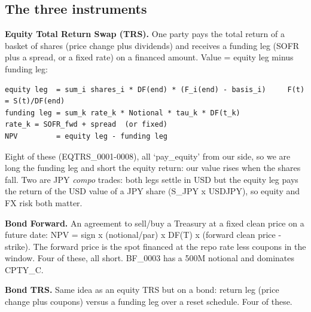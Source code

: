 \documentclass[11pt,letterpaper]{article}
\begin{document}
\subsection{The three instruments}
\textbf{Equity Total Return Swap (TRS).} One party pays the total return of a basket of shares (price change plus dividends) and receives a funding leg (SOFR plus a spread, or a fixed rate) on a financed amount. Value = equity leg minus funding leg:

{\fontsize{7.2}{8.8}\selectfont
\begin{verbatim}
equity leg  = sum_i shares_i * DF(end) * (F_i(end) - basis_i)     F(t) = S(t)/DF(end)
funding leg = sum_k rate_k * Notional * tau_k * DF(t_k)            rate_k = SOFR_fwd + spread  (or fixed)
NPV         = equity leg - funding leg
\end{verbatim}}
Eight of these (EQTRS\_0001-0008), all `pay\_equity' from our side, so we are long the funding leg and short the equity return: our value rises when the shares fall. Two are JPY \emph{compo} trades: both legs settle in USD but the equity leg pays the return of the USD value of a JPY share (S\_JPY x USDJPY), so equity and FX risk both matter.

\textbf{Bond Forward.} An agreement to sell/buy a Treasury at a fixed clean price on a future date: NPV = sign x (notional/par) x DF(T) x (forward clean price - strike). The forward price is the spot financed at the repo rate less coupons in the window. Four of these, all short. BF\_0003 has a 500M notional and dominates CPTY\_C.

\textbf{Bond TRS.} Same idea as an equity TRS but on a bond: return leg (price change plus coupons) versus a funding leg over a reset schedule. Four of these.
\end{document}
